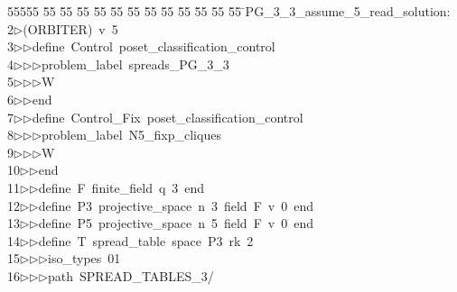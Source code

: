 %
%
\begin{tabbing}
55555 \= 55 \= 55 \= 55 \= 55 \= 55 \= 55 \= 55 \= 55 \= 55 \= 55 \= 55 \= 55 \= \>PG\_3\_3\_assume\_5\_read\_solution:\\[0pt]
2\>$\triangleright$\>(ORBITER)\ v\ 5\ \\[0pt]
3\>$\triangleright$\>$\triangleright$\>define\ Control\ poset\_classification\_control\ \\[0pt]
4\>$\triangleright$\>$\triangleright$\>$\triangleright$\>problem\_label\ spreads\_PG\_3\_3\ \\[0pt]
5\>$\triangleright$\>$\triangleright$\>$\triangleright$\>W\ \\[0pt]
6\>$\triangleright$\>$\triangleright$\>end\ \\[0pt]
7\>$\triangleright$\>$\triangleright$\>define\ Control\_Fix\ poset\_classification\_control\ \\[0pt]
8\>$\triangleright$\>$\triangleright$\>$\triangleright$\>problem\_label\ N5\_fixp\_cliques\ \\[0pt]
9\>$\triangleright$\>$\triangleright$\>$\triangleright$\>W\ \\[0pt]
10\>$\triangleright$\>$\triangleright$\>end\ \\[0pt]
11\>$\triangleright$\>$\triangleright$\>define\ F\ finite\_field\ q\ 3\ end\ \\[0pt]
12\>$\triangleright$\>$\triangleright$\>define\ P3\ projective\_space\ n\ 3\ field\ F\ v\ 0\ end\ \\[0pt]
13\>$\triangleright$\>$\triangleright$\>define\ P5\ projective\_space\ n\ 5\ field\ F\ v\ 0\ end\ \\[0pt]
14\>$\triangleright$\>$\triangleright$\>define\ T\ spread\_table\ space\ P3\ rk\ 2\ \\[0pt]
15\>$\triangleright$\>$\triangleright$\>$\triangleright$\>iso\_types\ 01\ \\[0pt]
16\>$\triangleright$\>$\triangleright$\>$\triangleright$\>path\ SPREAD\_TABLES\_3/\ \\[0pt]

\end{tabbing}
